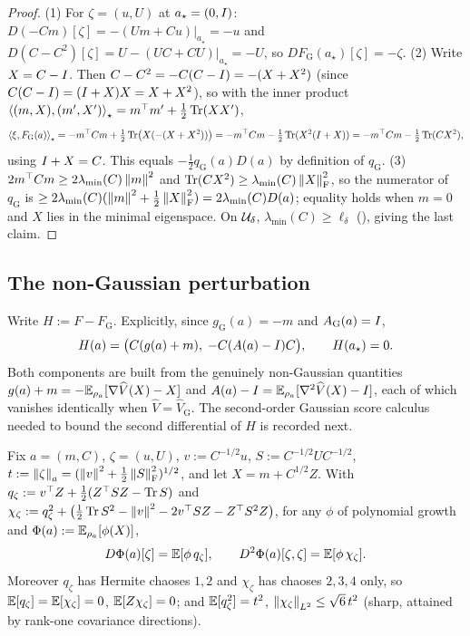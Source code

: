\begin{proof}
(1) For $\zeta=(u,U)$ at $a_\star=(0,I)$: $D(-Cm)[\zeta]=-(Um+Cu)|_{a_\star}=-u$ and
$D(C-C^2)[\zeta]=U-(UC+CU)|_{a_\star}=-U$, so $DF_{\mathrm G}(a_\star)[\zeta]=-\zeta$.
(2) Write $X=C-I$. Then $C-C^2=-C(C-I)=-(X+X^2)$ (since $C(C-I)=(I+X)X=X+X^2$),
so with the inner product $\left\langle (m,X),(m',X')\right\rangle_\star=m^\top m'+\tfrac12\operatorname{Tr}(XX')$,
\[
    \left\langle \xi,F_{\mathrm G}(a)\right\rangle_\star
    =-m^\top Cm+\tfrac12\operatorname{Tr}\bigl(X(-(X+X^2))\bigr)
    =-m^\top Cm-\tfrac12\operatorname{Tr}(X^2(I+X))
    =-m^\top Cm-\tfrac12\operatorname{Tr}(C X^2),
\]
using $I+X=C$. This equals $-\tfrac12 q_{\mathrm G}(a)D(a)$ by definition of $q_{\mathrm G}$.
(3) $2m^\top Cm\geq2\lambda_{\min}(C)\left\lVert m\right\rVert^2$ and $\operatorname{Tr}(CX^2)\geq\lambda_{\min}(C)\left\lVert X\right\rVert_{\mathrm{F}}^2$,
so the numerator of $q_{\mathrm G}$ is $\geq2\lambda_{\min}(C)(\left\lVert m\right\rVert^2+\tfrac12\left\lVert X\right\rVert_{\mathrm{F}}^2)=2\lambda_{\min}(C)D(a)$;
equality holds when $m=0$ and $X$ lies in the minimal eigenspace. On $\mathcal{U}_\delta$,
$\lambda_{\min}(C)\geq\ell_\delta$ (), giving the last claim.
\end{proof}

\subsection{The non-Gaussian perturbation}

Write $H:=F-F_{\mathrm G}$. Explicitly, since $g_{\mathrm G}(a)=-m$ and $A_{\mathrm G}(a)=I$,
\begin{equation}
\label{eq:H-def}
    H(a)=\bigl(C(g(a)+m),\;-C(A(a)-I)C\bigr),
    \qquad H(a_\star)=0 .
\end{equation}
Both components are built from the genuinely non-Gaussian quantities $g(a)+m=-\mathbb{E}_{\rho_a}[\nabla\widehat V(X)-X]$
and $A(a)-I=\mathbb{E}_{\rho_a}[\nabla^2\widehat V(X)-I]$, each of which vanishes identically when
$\widehat V=\widehat V_{\mathrm G}$. The second-order Gaussian score calculus needed to bound
the second differential of $H$ is recorded next.

\begin{lemma}
\label{lem:second-score}
Fix $a=(m,C)$, $\zeta=(u,U)$, $v:=C^{-1/2}u$, $S:=C^{-1/2}UC^{-1/2}$,
$t:=\left\lVert \zeta\right\rVert_a=(\left\lVert v\right\rVert^2+\tfrac12\left\lVert S\right\rVert_{\mathrm{F}}^2)^{1/2}$, and let $X=m+C^{1/2}Z$.
With $q_\zeta:=v^\top Z+\tfrac12(Z^\top SZ-\operatorname{Tr} S)$ and
$\chi_\zeta:=q_\zeta^2+\bigl(\tfrac12\operatorname{Tr} S^2-\left\lVert v\right\rVert^2-2v^\top SZ-Z^\top S^2Z\bigr)$, for any
$\phi$ of polynomial growth and $\Phi(a):=\mathbb{E}_{\rho_a}[\phi(X)]$,
\[
    D\Phi(a)[\zeta]=\mathbb{E}[\phi\,q_\zeta],
    \qquad
    D^2\Phi(a)[\zeta,\zeta]=\mathbb{E}[\phi\,\chi_\zeta].
\]
Moreover $q_\zeta$ has Hermite chaoses $1,2$ and $\chi_\zeta$ has chaoses $2,3,4$ only, so
$\mathbb{E}[q_\zeta]=\mathbb{E}[\chi_\zeta]=0$, $\mathbb{E}[Z\chi_\zeta]=0$; and $\mathbb{E}[q_\zeta^2]=t^2$,
$\left\lVert \chi_\zeta\right\rVert_{L^2}\leq\sqrt6\,t^2$ (sharp, attained by rank-one covariance directions).
\end{lemma}

